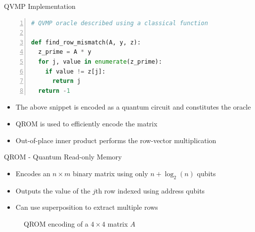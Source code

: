 \documentclass[10pt]{beamer}
\begin{document}
\begin{frame}[fragile]{QVMP Implementation}
  \begin{lstlisting}[frame=single,language=Python, numbers=left]
# QVMP oracle described using a classical function

def find_row_mismatch(A, y, z):
  z_prime = A * y
  for j, value in enumerate(z_prime):
    if value != z[j]:
      return j
  return -1
  \end{lstlisting}

  \begin{itemize}
    \item The above snippet is encoded as a quantum circuit and constitutes
      the oracle
    \item QROM is used to efficiently encode the matrix
    \item Out-of-place inner product performs the row-vector multiplication
  \end{itemize}
\end{frame}


\begin{frame}{QROM - Quantum Read-only Memory}
  \begin{itemize}
    \item Encodes an $n \times m$ binary matrix using only $n + \log_2(n)$ qubits
    \item Outputs the value of the $j$th row indexed using address qubits
    \item Can use superposition to extract multiple rows
  \end{itemize}
  \begin{figure}
      \centering
      \begin{subfigure}{\textwidth}
        \centering
        
      \end{subfigure}
      \caption{QROM encoding of a $4 \times 4$ matrix $A$}
      \label{fig:qrom_4x4}
  \end{figure}
\end{frame}
\end{document}
